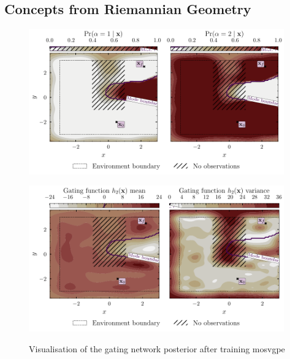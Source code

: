 \documentclass{mimosis-class/mimosis}
\numberwithin{equation}{chapter}
\begin{document}
{\subsection{Concepts from Riemannian Geometry \label{sec-geometry-recap}}
\label{sec:org37f5f15}
\begin{figure}[h!]
\centering
\begin{minipage}[r]{\columnwidth}
\centering
\includegraphics[width=0.98\textwidth]{./images/mode-opt/env/scenario_7/mosvgpe/mixing_probs_no_obs.pdf}
\label{eq-traj-opt-gating-network-prob-post}
\end{minipage}
\begin{minipage}{1.0\textwidth}
\centering
\includegraphics[width=0.98\textwidth]{./images/mode-opt/env/scenario_7/mosvgpe/desired_gating_gp_no_obs.pdf}
\label{eq-traj-opt-gating-network-gp-post}
\end{minipage}
\caption[\acrshort{mosvgpe}'s gating network posterior after training on simulated quadcopoter data set]{
Visualisation of the gating network posterior after training \acrshort{mosvgpe}
}
\end{figure}}
\end{document}
